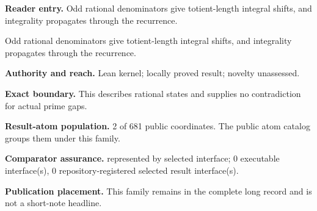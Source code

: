 \documentclass[11pt]{article}
\begin{document}
\textbf{Reader entry.} Odd rational denominators give totient-length integral shifts, and integrality propagates through the recurrence.

Odd rational denominators give totient-length integral shifts, and integrality propagates through the recurrence.

\textbf{Authority and reach.} Lean kernel; locally proved result; novelty unassessed.

\textbf{Exact boundary.} This describes rational states and supplies no contradiction for actual prime gaps.

\textbf{Result-atom population.} 2 of 681 public coordinates. The public atom catalog groups them under this family.

\textbf{Comparator assurance.} represented by selected interface; 0 executable interface(s), 0 repository-registered selected result interface(s).

\textbf{Publication placement.} This family remains in the complete long record and is not a short-note headline.
\end{document}
